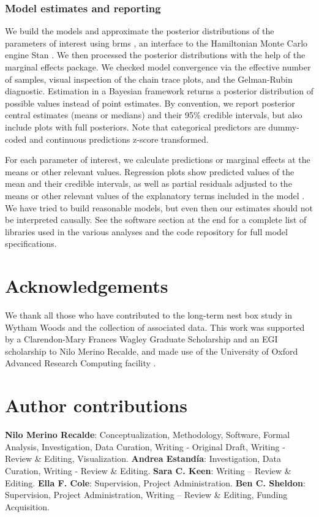 \documentclass[9pt, twocolumn, twoside]{gsajnl}
\begin{document}
\subsubsection{Model estimates and reporting}

We build the models and approximate the posterior distributions of the parameters of interest using brms \parencite{burkner2017}, an interface to the Hamiltonian Monte Carlo engine Stan \parencite{stan2023}. We then processed the posterior distributions with the help of the marginal effects package. We checked model convergence via the effective number of samples, visual inspection of the chain trace plots, and the Gelman-Rubin diagnostic. Estimation in a Bayesian framework returns a posterior distribution of possible values instead of point estimates. By convention, we report posterior central estimates (means or medians) and their 95\% credible intervals, but also include plots with full posteriors. Note that categorical predictors are dummy-coded and continuous predictions z-score transformed.

For each parameter of interest, we calculate predictions or marginal effects at the means or other relevant values.  Regression plots show predicted values of the mean and their credible intervals, as well as partial residuals adjusted to the means or other relevant values of the explanatory terms included in the model \parencite{fox2018, larsen1972}. We have tried to build reasonable models, but even then our estimates should not be interpreted causally. See the software section at the end for a complete list of libraries used in the various analyses and the code repository for full model specifications.

\section{Acknowledgements}

We thank all those who have contributed to the long-term nest box study in Wytham Woods and the collection of associated data. This work was supported by a Clarendon-Mary Frances Wagley Graduate Scholarship and an EGI scholarship to Nilo Merino Recalde, and made use of the University of Oxford Advanced Research Computing facility \parencite{richards2015}.

\section{Author contributions}
\textbf{Nilo Merino Recalde}: Conceptualization, Methodology, Software, Formal Analysis, Investigation, Data Curation, Writing - Original Draft, Writing - Review \& Editing, Visualization. 
\textbf{Andrea Estandía}: Investigation, Data Curation, Writing - Review \& Editing.
\textbf{Sara C. Keen}: Writing -- Review \& Editing.
\textbf{Ella F. Cole}: Supervision, Project Administration.
\textbf{Ben C. Sheldon}: Supervision, Project Administration, Writing -- Review \& Editing, Funding Acquisition.
\end{document}
